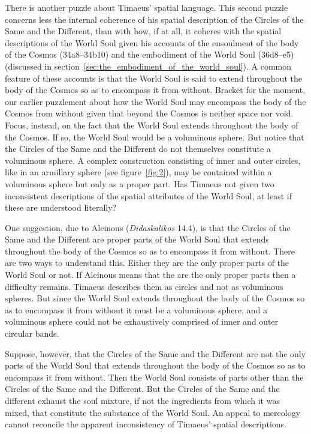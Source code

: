 There is another puzzle about Timaeus' spatial language. This second puzzle concerns less the internal coherence of his spatial description of the Circles of the Same and the Different, than with how, if at all, it coheres with the spatial descriptions of the World Soul given his accounts of the ensoulment of the body of the Cosmos (34a8--34b10) and the embodiment of the World Soul (36d8--e5) (discussed in section~\ref{sec:the_embodiment_of_the_world_soul}). A common feature of these accounts is that the World Soul is said to extend throughout the body of the Cosmos so as to encompass it from without. Bracket for the moment, our earlier puzzlement about how the World Soul may encompass the body of the Cosmos from without given that beyond the Cosmos is neither space nor void. Focus, instead, on the fact that the World Soul extends throughout the body of the Cosmos. If so, the World Soul would be a voluminous sphere. But notice that the Circles of the Same and the Different do not themselves constitute a voluminous sphere. A complex construction consisting of inner and outer circles, like in an armillary sphere (see figure~\ref{fig:2}), may be contained within a voluminous sphere but only as a proper part. Has Timaeus not given two inconsistent descriptions of the spatial attributes of the World Soul, at least if these are understood literally?

One suggestion, due to Alcinous (\emph{Didaskalikos} 14.4), is that the Circles of the Same and the Different are proper parts of the World Soul that extends throughout the body of the Cosmos so as to encompass it from without. There are two ways to understand this. Either they are the only proper parts of the World Soul or not. If Alcinous means that the are the only proper parts then a difficulty remains. Timaeus describes them as circles and not as voluminous spheres. But since the World Soul extends throughout the body of the Cosmos so as to encompass it from without it must be a voluminous sphere, and a voluminous sphere could not be exhaustively comprised of inner and outer circular bands. 

Suppose, however, that the Circles of the Same and the Different are not the only parts of the World Soul that extends throughout the body of the Cosmos so as to encompass it from without. Then the World Soul consists of parts other than the Circles of the Same and the Different. But the Circles of the Same and the different exhaust the soul mixture, if not the ingredients from which it was mixed, that constitute the substance of the World Soul. An appeal to mereology cannot reconcile the apparent inconsistency of Timaeus' spatial descriptions.

